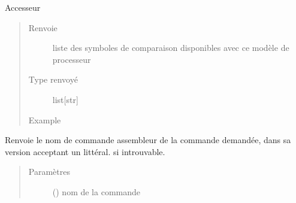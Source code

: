 \documentclass[letterpaper,10pt,french]{sphinxmanual}
\begin{document}
\begin{fulllineitems}
\begin{fulllineitems}
\begin{quote}
\begin{description}
\end{description}\end{quote}

\end{fulllineitems}


\begin{fulllineitems}
\label{\detokenize{processorengine:processorengine.ProcessorEngine.getComparaisonSymbolsAvailables}}
Accesseur
\begin{quote}\begin{description}
\item[{Renvoie}] \leavevmode
liste des symboles de comparaison disponibles avec ce modèle de processeur

\item[{Type renvoyé}] \leavevmode
list{[}str{]}

\item[{Example}] \leavevmode
\begin{sphinxVerbatim}[commandchars=\\\{\}]
\end{sphinxVerbatim}

\end{description}\end{quote}

\end{fulllineitems}


\begin{fulllineitems}
\label{\detokenize{processorengine:processorengine.ProcessorEngine.getLitteralAsmCommand}}
Renvoie le nom de commande assembleur de la commande demandée, dans sa version acceptant un littéral. \sphinxcode{\sphinxupquote{\textquotesingle{}\textquotesingle{}}} si introuvable.
\begin{quote}\begin{description}
\item[{Paramètres}] \leavevmode
{} () \textendash{} nom de la commande


\end{description}
\end{quote}
\end{fulllineitems}
\end{fulllineitems}
\end{document}
